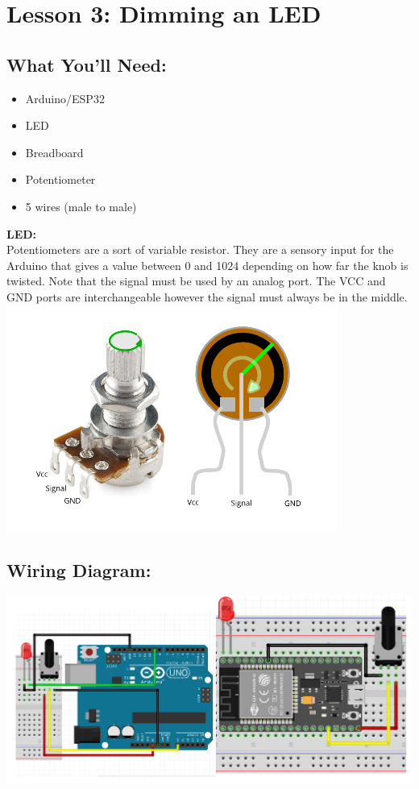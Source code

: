 \documentclass[a4paper,12pt]{report}
\newcommand{\diagramWidth}{150mm}
\begin{document}
\newpage

\section*{Lesson 3: Dimming an LED}
    \subsection*{What You'll Need:}
            \begin{itemize}
                \item Arduino/ESP32
                \item LED
                \item Breadboard
                \item Potentiometer
                \item 5 wires (male to male)
            \end{itemize}
        \begin{mdframed}[linewidth = 3, linecolor = turbo_purple]
            \textbf{LED:}
            \\
            Potentiometers are a sort of variable resistor. They are a sensory input for the Arduino that gives a value between 0 and 1024 depending on how far the knob is twisted. Note that the signal must be used by an analog port. The VCC and GND ports are interchangeable however the signal must always be in the middle. \\
            \includegraphics[scale = 1]{Assets/pot.png}
        \end{mdframed}
    \subsection*{Wiring Diagram:}
    \includegraphics[width = \diagramWidth]{Assets/arduino_esp_pot.png}
\newpage
\end{document}
